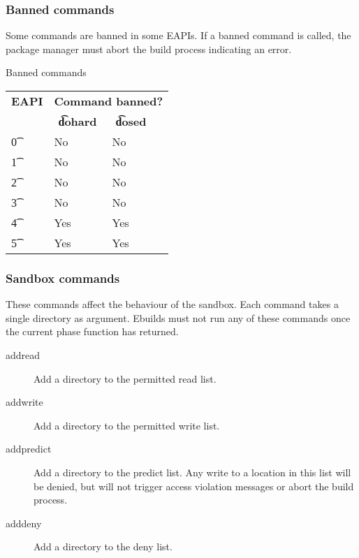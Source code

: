 \subsubsection{Banned commands}
\label{sec:banned-commands}

 Some commands are banned in some EAPIs. If a banned command is
called, the package manager must abort the build process indicating an error.

\begin{centertable}{Banned commands} \label{tab:banned-commands-table}
    \begin{tabular}{ l l l l }
        \toprule
        \multicolumn{1}{c}{\textbf{EAPI}} &
        \multicolumn{3}{c}{\textbf{Command banned?}} \\
        \multicolumn{1}{c}{} &
        \multicolumn{1}{c}{\textbf{\t{dohard}}} &
        \multicolumn{1}{c}{\textbf{\t{dosed}}} \\
        \midrule
    \t{0} & No & No \\
    \t{1} & No & No \\
    \t{2} & No & No \\
    \t{3} & No & No \\
    \t{4} & Yes & Yes \\
    \t{5} & Yes & Yes \\
    \bottomrule
    \end{tabular}
\end{centertable}

\subsubsection{Sandbox commands}
These commands affect the behaviour of the sandbox. Each command takes a single directory as
argument. Ebuilds must not run any of these commands once the current phase function has returned.
\begin{description}
\item[addread] Add a directory to the permitted read list.
\item[addwrite] Add a directory to the permitted write list.
\item[addpredict] Add a directory to the predict list. Any write to a location in this list will be
    denied, but will not trigger access violation messages or abort the build process.
\item[adddeny] Add a directory to the deny list.
\end{description}

